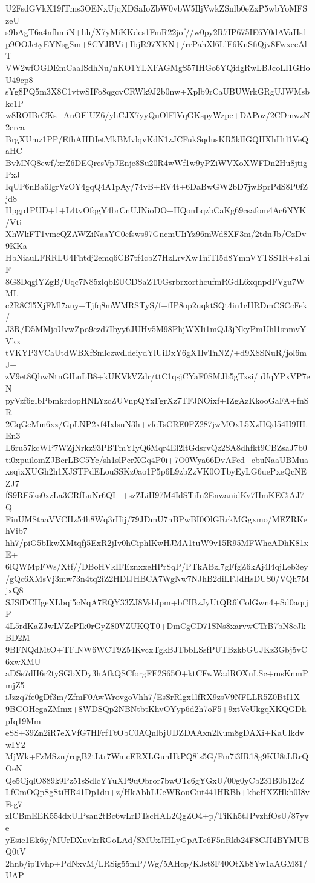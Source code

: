 U2FsdGVkX19fTms3OENxUjqXDSaIoZbW0vbW5IljVwkZSnlb0eZxP5wbYoMFSzeU
s9bAgT6a4nfhmiN+hh/X7yMiKKdes1FmR22jof//w0py2R7IP675IE6Y0dAVaHs1
p9OOJetyEYNsgSm+8CYJBVi+IbjR97XKN+/rrPahXl6LlF6KnSfiQjv8FwxeeAlT
VW2wfOGDEmCaaISdhNu/nKO1YLXFAGMgS57IHGo6YQidgRwLBJcoLI1GHoU49cp8
sYg8PQ5m3X8C1vtwSIFo8qgcvCRWk9J2b0nw+Xplb9rCaUBUWrkGRgUJWMsbkc1P
w8ROIBrCKs+AnOElUZ6/yhCJX7yyQuOlFlVqGKspyWzpe+DAPoz/2CDmwzN2erca
BrgXUmz1PP/EfhAHDIetMkBMvlqvKdN1zJCFukSqdusKR5klIGQHXhHtl1VeQaHC
BvMNQ8ewf/xrZ6DEQresVpJEnje8Su20R4wWf1w9yPZiWVXoXWFDn2Hu8jtigPxJ
IqUP6nBa6IgrVzOY4gqQ4A1pAy/74vB+RV4t+6DaBwGW2bD7jwBprPdS8P0fZjd8
Hpgp1PUD+1+L4tvOfqgY4brCnUJNioDO+HQonLqzbCaKg69csafom4Ac6NYK/Vti
XhWkFT1vmcQZAWZiNaaYC0efsws97GncmUIiYz96mWd8XF3m/2tdnJb/CzDv9KKa
HbNiauLFRRLU4Fhtdj2emq6CB7tf4cbZ7HzLrvXwTniTI5d8YmnVYTSS1R+s1hiF
8G8DqglYZgB/Uqc7N85zlqbEUCDSaZT0GsrbrxorthcufmRGdL6xqnpdFVgu7WML
c2R8Cl5XjFMl7auy+Tjfq8mWMRSTyS/f+fIP8op2uqktSQt4in1cHRDmCSCcFek/
J3R/D5MMjoUvwZpo9czd7Ibyy6JUHv5M98PhjWXIi1mQJ3jNkyPmUhl1snmvYVkx
tVKYP3VCaUtdWBXfSmlczwdldeiydYlUiDxY6gX1lvTnNZ/+d9X8SNuR/jol6mJ+
zV9et8QhwNtnGlLnLB8+kUKVkVZdr/ttC1qsjCYaF0SMJb5gTxsi/uUqYPxVP7eN
pyVzf6glbPbmkrdopHNLYzcZUVnpQYxFgrXz7TFJNOixf+IZgAzKkooGaFA+fnSR
2GqGcMm6xz/GpLNP2xf4IxlsuN3h+vfeTsCRE0FZ287jwMOxL5XzHQd54H9HLEn3
L6ru57kcWP7WZjNrkz93PBTmYIyQ6Mqr4El2ltGdsrvQz2SA8dhfkt9CBZsaJ7b0
ti0xpuilomZJBerLBC5Yc/sh1slPcrXGq4P0i+7O0Wya66DvAFcd+cbuNaaUBMua
xsqjxXUGh2h1XJSTPdELouSSKz0ao1P5p6L9zbZzVK0OTbyEyLG6uePxeQcNEZJ7
fS9RF5ks0xzLa3CRfLuNr6QI++szZLiH97M4IdSTiIn2EnwanidKv7HmKECiAJ7Q
FinUMStaaVVCHz54h8Wq3rHij/79JDmU7nBPwBI0OlGRrkMGgxmo/MEZRKehVib7
hh7/piG5bIkwXMtqfj5ExR2jIv0hCiphlKwHJMA1tuW9v15R95MFWhcADhK81xE+
6lQWMpFWs/Xtf//DBoHVkIFEznxxeHPrSqP/PTkABzl7gFfgZ6kAj4l4qjLeb3ey
/gQc6XMsVj3mw73n4tq2iZ2HDIJHBCA7WgNw7NJhB2diLFJdHsDUS0/VQh7MjxQ8
SJSfDCHgeXLbqi5cNqA7EQY33ZJ8VsbIpm+bCIBzJyUtQR6lColGwn4+Sd0aqrjP
4L5rdKaZJwLVZcPIk0rGyZ80VZUKQT0+DmCgCD71SNs8xarvwCTrB7bN8cJkBD2M
9BFNQdMtO+TFlNW6WCT9Z54KvcxTgkBJTbbLSsfPUTBzkbGUJKz3Gbj5vC6xwXMU
aDSs7dH6r2tySGbXDy3hAfkQSCforgFE2S65O+ktCFwWadROXnLSc+msKnmPmjZ5
iJzzq7fe0gDf3m/ZfmF0AwWrovgoVhh7/EsSrRlgx1lfRX9zsV9NFLLR5Z0BtI1X
9BGOHegaZMmx+8WDSQp2NBNtbtKhvOYyp6d2h7oF5+9xtVcUkgqXKQGDhpIq19Mm
eSS+39Zn2iR7eXVfG7HFrfTtObC0AQnlbjUDZDAAxn2Kum8gDAXi+KaUlkdvwIY2
MjWk+FzMSzn/rqgB2tLtr7WmcERXLGunHkPQ8ls5G/Fm7i3IR18g9KU8tLRrQOeN
Qe5CjqlO889k9Pz51sSdlcYYuXP9uObror7bwOTc6gYGxU/00g0yCb231B0b12cZ
LfCmOQpSgStiHR41Dp1du+z/HkAbhLUeWRouGut441HRBb+kheHXZHkb0I8vFsg7
zICBmEEK554dxUlPsan2tBc6wLrDTscHAL2QgZO4+p/TiKh5tJPvzhfOsU/87yve
yEsie1Ek6y/MUrDXuvkrRGoLAd/SMUxJHLyGpATe6F5nRkb24F8CJI4BYMUBQ0tV
2hnb/ipTvhp+PdNxvM/LRSig55mP/Wg/5AHcp/KJst8F40OtXb8Yw1aAGM81/UAP
